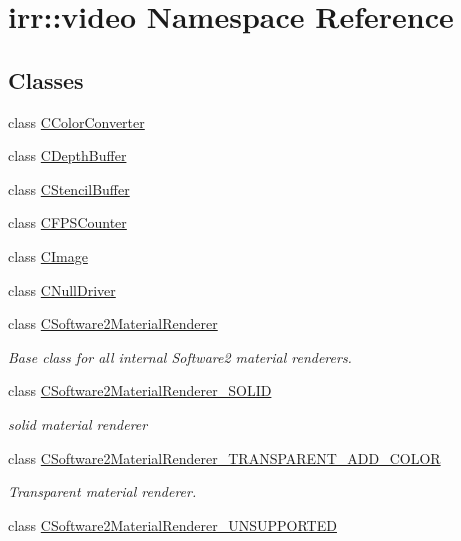 \hypertarget{namespaceirr_1_1video}{\section{irr\-:\-:video Namespace Reference}
\label{namespaceirr_1_1video}
}
\subsection*{Classes}
\begin{DoxyCompactItemize}
\item 
class \hyperlink{classirr_1_1video_1_1_c_color_converter}{C\-Color\-Converter}
\item 
class \hyperlink{classirr_1_1video_1_1_c_depth_buffer}{C\-Depth\-Buffer}
\item 
class \hyperlink{classirr_1_1video_1_1_c_stencil_buffer}{C\-Stencil\-Buffer}
\item 
class \hyperlink{classirr_1_1video_1_1_c_f_p_s_counter}{C\-F\-P\-S\-Counter}
\item 
class \hyperlink{classirr_1_1video_1_1_c_image}{C\-Image}
\item 
class \hyperlink{classirr_1_1video_1_1_c_null_driver}{C\-Null\-Driver}
\item 
class \hyperlink{classirr_1_1video_1_1_c_software2_material_renderer}{C\-Software2\-Material\-Renderer}
\begin{DoxyCompactList}\small\item\em Base class for all internal Software2 material renderers. \end{DoxyCompactList}\item 
class \hyperlink{classirr_1_1video_1_1_c_software2_material_renderer___s_o_l_i_d}{C\-Software2\-Material\-Renderer\-\_\-\-S\-O\-L\-I\-D}
\begin{DoxyCompactList}\small\item\em solid material renderer \end{DoxyCompactList}\item 
class \hyperlink{classirr_1_1video_1_1_c_software2_material_renderer___t_r_a_n_s_p_a_r_e_n_t___a_d_d___c_o_l_o_r}{C\-Software2\-Material\-Renderer\-\_\-\-T\-R\-A\-N\-S\-P\-A\-R\-E\-N\-T\-\_\-\-A\-D\-D\-\_\-\-C\-O\-L\-O\-R}
\begin{DoxyCompactList}\small\item\em Transparent material renderer. \end{DoxyCompactList}\item 
class \hyperlink{classirr_1_1video_1_1_c_software2_material_renderer___u_n_s_u_p_p_o_r_t_e_d}{C\-Software2\-Material\-Renderer\-\_\-\-U\-N\-S\-U\-P\-P\-O\-R\-T\-E\-D}

\end{DoxyCompactItemize}
